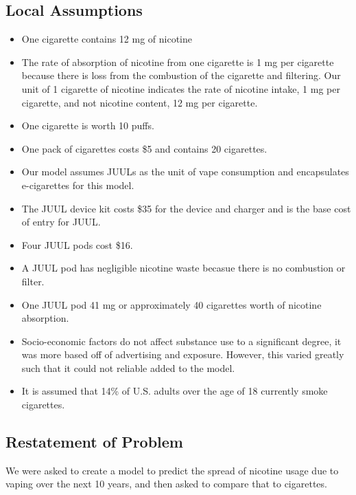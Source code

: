 \documentclass[12pt,letterpaper]{article}
\begin{document}
\subsection{Local Assumptions}
\begin{itemize}
  \item One cigarette contains 12 mg of nicotine \citep{matthews_how_2017}
  \item The rate of absorption of nicotine from one cigarette is 1 mg per cigarette because there is loss from the combustion of the cigarette and filtering. Our unit of 1 cigarette of nicotine indicates the rate of nicotine intake, 1 mg per cigarette, and not nicotine content, 12 mg per cigarette. \citep[501]{benowitz_daily_1984}
  \item One cigarette is worth 10 puffs. \citep{noauthor_e-cigarette_2014}
  \item One pack of cigarettes costs \$5 and contains 20 cigarettes.
  \item Our model assumes JUULs as the unit of vape consumption and encapsulates e-cigarettes for this model.
  \item The JUUL device kit costs \$35 for the device and charger and is the base cost of entry for JUUL. \citep{noauthor_juul_nodate}
  \item Four JUUL pods cost \$16. \citep{noauthor_buy_nodate}
  \item A JUUL pod has negligible nicotine waste becasue there is no combustion or filter.
  \item One JUUL pod 41 mg or approximately 40 cigarettes worth of nicotine absorption. \citep{noauthor_juulpods_nodate}
  \item Socio-economic factors do not affect substance use to a significant degree,\citep{simon_socioeconomic_2018} it was more based off of advertising and exposure.\citep{redonnet_tobacco_2012} However, this varied greatly such that it could not reliable added to the model.
  \item It is assumed that 14\% of U.S. adults over the age of 18 currently smoke cigarettes.\citep{cdc_current_2019}
\end{itemize}

\subsection{Restatement of Problem}
We were asked to create a model to predict the spread of nicotine usage due to vaping over the next 10 years, and then asked to compare that to cigarettes.
\end{document}
